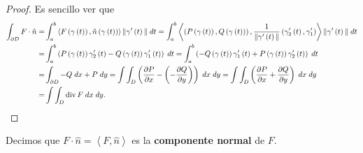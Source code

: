 \begin{proof}
Es sencillo ver que
\[
\begin{split}
	\int _{\partial D}F \cdot \hat{n} = & \int^{b}_{a} \left\langle F\left(\gamma\left(t\right)\right), \hat{n}\left(\gamma\left(t\right)\right) \right\rangle \|\gamma'\left(t\right)\| \; dt = \int^{b}_{a} \left\langle \left(P\left(\gamma\left(t\right)\right), Q\left(\gamma\left(t\right)\right)\right), \frac{1}{\|\gamma'\left(t\right)\|}\left(\gamma'_{2}\left(t\right), \gamma_{1}'\right) \right\rangle \|\gamma'\left(t\right)\|\; dt\\
	= & \int^{b}_{a} \left(P\left(\gamma\left(t\right)\right)\gamma_{2}'\left(t\right)-Q\left(\gamma\left(t\right)\right)\gamma'_{1}\left(t\right)\right) \; dt = \int^{b}_{a} \left(-Q\left(\gamma\left(t\right)\right)\gamma_{1}'\left(t\right) + P\left(\gamma\left(t\right)\right)\gamma'_{2}\left(t\right)\right) \; dt \\
	= & \int _{\partial D}-Q \; dx + P \; dy = \int \int _{D}\left(\frac{\partial P}{\partial x}-\left(-\frac{\partial Q}{\partial y}\right)\right) \; dx \; dy = \int \int _{D}\left(\frac{\partial P}{\partial x}+ \frac{\partial Q}{\partial y}\right) \; dx \; dy \\
	= & \int \int _{D}\operatorname{div} F \; dx \; dy.
\end{split}
\]
\end{proof}

\begin{notation}
Decimos que $\displaystyle F \cdot \hat{n} = \left\langle F, \hat{n} \right\rangle  $ es la \textbf{componente normal} de $\displaystyle F $. 
\end{notation}



